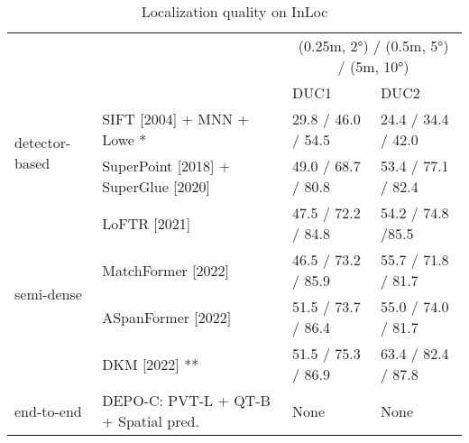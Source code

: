 \begin{table}[h!]
\centering
\caption{Localization quality on InLoc}
\label{tab:inloc}
\begin{tabular}{llll}
\toprule
 &  & \multicolumn{2}{c}{(0.25m, 2°) / (0.5m, 5°) / (5m, 10°)} \\
 &  & DUC1 & DUC2 \\
\midrule
\multirow[c]{2}{*}{detector-based} & SIFT [2004] \cite{lowe2004distinctive} + MNN + Lowe * & 29.8 / 46.0 / 54.5 & 24.4 / 34.4 / 42.0 \\
 & SuperPoint [2018] \cite{detone2018superpoint} + SuperGlue [2020] \cite{sarlin2020superglue} & 49.0 / 68.7 / 80.8 & 53.4 / 77.1 / 82.4 \\
\cline{1-4}
\multirow[c]{4}{*}{semi-dense} & LoFTR [2021] \cite{sun2021loftr} & 47.5 / 72.2 / 84.8 & 54.2 / 74.8 /85.5 \\
 & MatchFormer [2022] \cite{wang2022matchformer} & 46.5 / 73.2 / 85.9 & 55.7 / 71.8 / 81.7 \\
 & ASpanFormer [2022] \cite{chen2022aspanformer} & 51.5 / 73.7 / 86.4 & 55.0 / 74.0 / 81.7 \\
 & DKM [2022] \cite{edstedt2022deep} ** & 51.5 / 75.3 / 86.9 & 63.4 / 82.4 / 87.8 \\
\cline{1-4}
end-to-end & DEPO-C: PVT-L + QT-B + Spatial pred. & None & None \\
\cline{1-4}
\bottomrule
\end{tabular}
\end{table}
